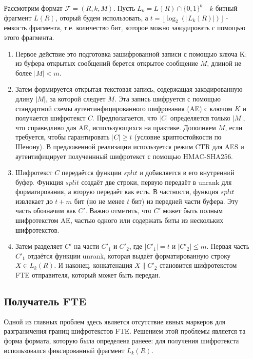 Рассмотрим формат $\mathcal{F} = (R, k, M)$.
Пусть $L_k = L(R) \cap \{0, 1\}^k$ - $k$-битный фрагмент $L(R)$,
оторый будем использовать, а $t = \lfloor \log_2(|L_k(R)|) \rfloor$ - емкость фрагмента,
т.е. количество бит, которое можно закодировать с помощью этого фрагмента.

\begin{enumerate}
    \item Первое действие это подготовка зашифрованной записи с помощью ключа K:
          из буфера открытых сообщений берется открытое сообщение $M$, длиной не более $|M| < m$.
    \item Затем формируется открытая текстовая запись, содержащая закодированную длину $|M|$, за которой следует $M$.
          Эта запись шифруется с помощью стандартной схемы аутентинфицированного шифрования (AE) с ключом $K$ и получается шифротекст $C$.
          Предполагается, что $|C|$ определяется только $|M|$, что справедливо для AE, использующихся на практике.
          Дополняем $M$, если требуется, чтобы гарантировать $|C| \geq t$ (условие криптостойкости по Шенону).
          В предложенной реализации используется режим CTR для AES и аутентифицирует полученнный шифротекст с помощью HMAC-SHA256.
    \item Шифротекст $C$ передаётся функции $split$ и добавляется в его внутренний буфер.
          Функция $split$ создаёт две строки, первую передаёт в unrank для форматирования, а вторую передаёт как есть.
          В частности, функция $split$ извлекает до $t + m$ бит (но не менее $t$ бит) из передней части буфера. Эту часть обозначим как $C'$.
          Важно отметить, что $C'$ может быть полным шифротекстом AE, частью одного или содержать биты из нескольких шифротекстов.
    \item Затем разделяет $C'$ на части $C'_1$ и $C'_2$, где $|C'_1| = t$ и $|C'_2| \leq m$.
          Первая часть $C'_1$ отдаётся функции unrank, которая выдаёт форматированную строку $X \in L_k(R)$.
          И наконец, конкатенация $X \| C'_2$ становится шифротекстом FTE отправителя, который может быть передан.
\end{enumerate}

\subsection{Получатель FTE}

Одной из главных проблем здесь является отсутствие явных маркеров для разграничения границ шифротекстов FTE.
Решением этой проблемы является та форма формата, которую была определена ранеее:
для получения шифротекста использовался фиксированный фрагмент $L_k(R)$.

